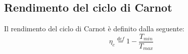 \documentclass[a4paper,10pt]{article}
\begin{document}
\subsection{Rendimento del ciclo di Carnot}
\label{subsec:rendimento_carnot}
Il rendimento del ciclo di Carnot è definito dalla seguente:
\begin{equation}
 \eta_c \stackrel{def}{=} 1 - \frac{T_{min}}{T_{max}}
\end{equation}
\end{document}
